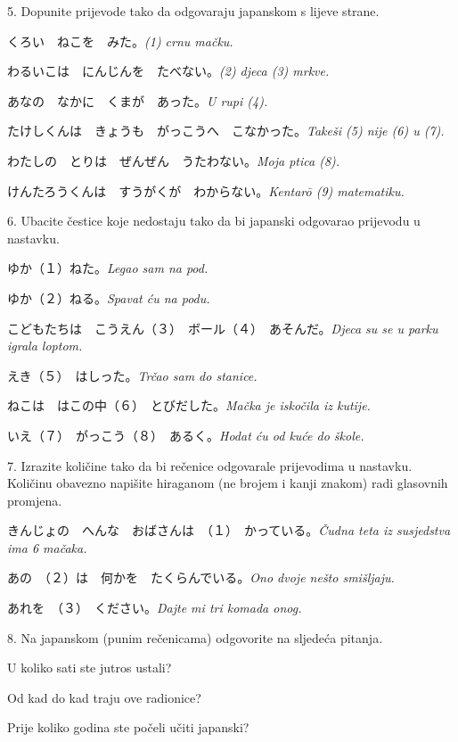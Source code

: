 	\begin{mondai}{5. Dopunite prijevode tako da odgovaraju japanskom s lijeve strane.}
		\item くろい　ねこを　みた。\textit{(1) crnu mačku.}
		\item わるいこは　にんじんを　たべない。\textit{(2) djeca (3) mrkve.}
		\item あなの　なかに　くまが　あった。\textit{U rupi (4).}
		\item たけしくんは　きょうも　がっこうへ　こなかった。\textit{Takeši (5) nije (6) u (7).}
		\item わたしの　とりは　ぜんぜん　うたわない。\textit{Moja ptica (8).}
		\item けんたろうくんは　すうがくが　わからない。\textit{Kentar\={o} (9) matematiku.}
	\end{mondai}
	
	\newpage
	\begin{mondai}{6. Ubacite čestice koje nedostaju tako da bi japanski odgovarao prijevodu u nastavku.}
		\item ゆか（１）ねた。\textit{Legao sam na pod.}
		\item ゆか（２）ねる。\textit{Spavat ću na podu.}
		\item こどもたちは　こうえん（３）　ボール（４）　あそんだ。\textit{Djeca su se u parku igrala loptom.}
		\item えき（５）　はしった。\textit{Trčao sam do stanice.}
		\item ねこは　はこの中（６）　とびだした。\textit{Mačka je iskočila iz kutije.}
		\item いえ（７）　がっこう（８）　あるく。\textit{Hodat ću od kuće do škole.}
	\end{mondai}

	\begin{mondai}{7. Izrazite količine tako da bi rečenice odgovarale prijevodima u nastavku. Količinu obavezno napišite hiraganom (ne brojem i kanji znakom) radi glasovnih promjena.}
		\item きんじょの　へんな　おばさんは　（１）　かっている。\textit{Čudna teta iz susjedstva ima 6 mačaka.}
		\item あの　（２）は　何かを　たくらんでいる。\textit{Ono dvoje nešto smišljaju.}
		\item あれを　（３）　ください。\textit{Dajte mi tri komada onog.}
	\end{mondai}

	\begin{mondai}{8. Na japanskom (punim rečenicama) odgovorite na sljedeća pitanja.}
		\item U koliko sati ste jutros ustali?
		\item Od kad do kad traju ove radionice?
		\item Prije koliko godina ste počeli učiti japanski?
	\end{mondai}

